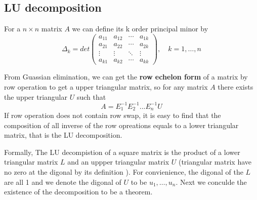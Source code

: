 \documentclass[en,hazy,black,pc,12pt]{elegantnote}
\begin{document}
\subsection{LU decomposition}
\begin{definition}
    For a \(n \times n\) matrix \(A\) we can define its k order principal minor by \[\Delta_k = det\begin{pmatrix}
        a_{11} & a_{12} & \cdots & a_{1k} \\
a_{21} & a_{22} & \cdots & a_{2k} \\
\vdots & \vdots & \ddots & \vdots \\
a_{k1} & a_{k2} & \cdots & a_{kk}
    \end{pmatrix}, \quad k=1,\ldots,n\]
\end{definition}

From Guassian elimination, we can get the \textbf{row echelon form} of a matrix by row operation to get a upper triangular matrix, so for any matrix \(A\) there exists the upper triangular \(U\) such that 
\[ A = E_1^{-1}E_2^{-1}...E_n^{-1}U \]
If row operation does not contain row swap, it is easy to find that the composition of all inverse of the row opreations equals to a lower triangular matrix, that is the LU decomposition.

Formally, The LU decompistion of a square matrix is the product of a lower triangular matrix \(L\) and an uppper triangular matrix \(U\) (triangular matrix have no zero at the digonal by its definition ). For convienience, the digonal of the \(L\) are all 1 and we denote the digonal of \(U\) to be \(u_1, \ldots , u_n\). Next we conculde the existence of the decomposition to be a theorem.
\end{document}
